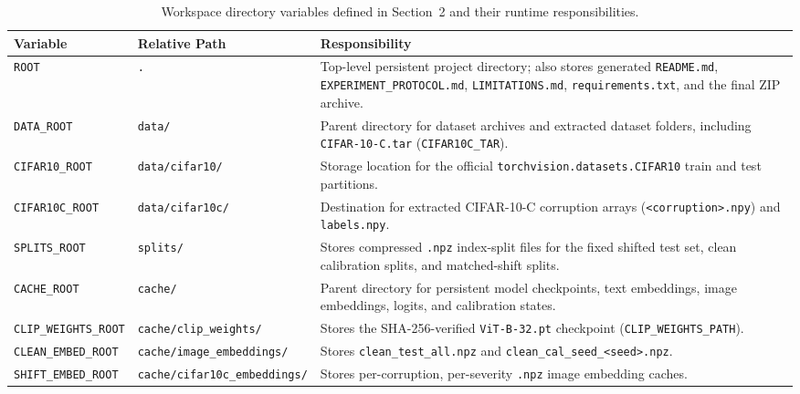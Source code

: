 \documentclass[11pt,a4paper]{article}
\begin{document}
\begin{table}[!htbp]
\centering
\caption{Workspace directory variables defined in Section~2 and their runtime responsibilities.}
\label{tab:directories}
\small\begin{tabularx}{\textwidth}{l l Y}
\toprule
\textbf{Variable} & \textbf{Relative Path} & \textbf{Responsibility} \\
\midrule
\texttt{ROOT} & \texttt{.} & Top-level persistent project directory; also stores generated \texttt{README.md}, \texttt{EXPERIMENT\_\allowbreak{}PROTOCOL.md}, \texttt{LIMITATIONS.md}, \texttt{requirements.txt}, and the final ZIP archive. \\
\texttt{DATA\_\allowbreak{}ROOT} & \texttt{data/\allowbreak{}} & Parent directory for dataset archives and extracted dataset folders, including \texttt{CIFAR-10-C.tar} (\texttt{CIFAR10C\_\allowbreak{}TAR}). \\
\texttt{CIFAR10\_\allowbreak{}ROOT} & \texttt{data/\allowbreak{}cifar10/\allowbreak{}} & Storage location for the official \texttt{torchvision.datasets.CIFAR10} train and test partitions. \\
\texttt{CIFAR10C\_\allowbreak{}ROOT} & \texttt{data/\allowbreak{}cifar10c/\allowbreak{}} & Destination for extracted CIFAR-10-C corruption arrays (\texttt{<corruption>.npy}) and \texttt{labels.npy}. \\
\texttt{SPLITS\_\allowbreak{}ROOT} & \texttt{splits/\allowbreak{}} & Stores compressed \texttt{.npz} index-split files for the fixed shifted test set, clean calibration splits, and matched-shift splits. \\
\texttt{CACHE\_\allowbreak{}ROOT} & \texttt{cache/\allowbreak{}} & Parent directory for persistent model checkpoints, text embeddings, image embeddings, logits, and calibration states. \\
\texttt{CLIP\_\allowbreak{}WEIGHTS\_\allowbreak{}ROOT} & \texttt{cache/\allowbreak{}clip\_\allowbreak{}weights/\allowbreak{}} & Stores the SHA-256-verified \texttt{ViT-B-32.pt} checkpoint (\texttt{CLIP\_\allowbreak{}WEIGHTS\_\allowbreak{}PATH}). \\
\texttt{CLEAN\_\allowbreak{}EMBED\_\allowbreak{}ROOT} & \texttt{cache/\allowbreak{}image\_\allowbreak{}embeddings/\allowbreak{}} & Stores \texttt{clean\_\allowbreak{}test\_\allowbreak{}all.npz} and \texttt{clean\_\allowbreak{}cal\_\allowbreak{}seed\_\allowbreak{}<seed>.npz}. \\
\texttt{SHIFT\_\allowbreak{}EMBED\_\allowbreak{}ROOT} & \texttt{cache/\allowbreak{}cifar10c\_\allowbreak{}embeddings/\allowbreak{}} & Stores per-corruption, per-severity \texttt{.npz} image embedding caches. \\

\end{tabularx}
\end{table}
\end{document}

